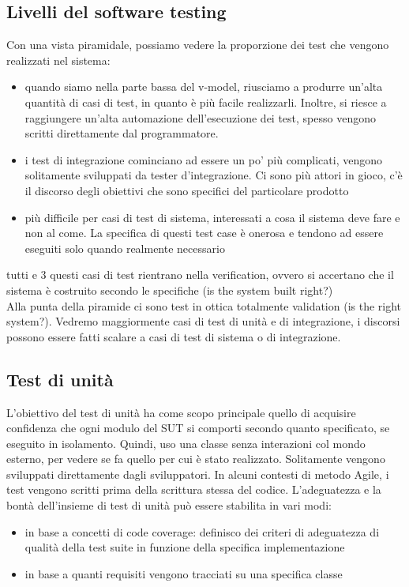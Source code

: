 \documentclass{article}
\begin{document}
\subsection{Livelli del software testing}
Con una vista piramidale, possiamo vedere la proporzione dei test che vengono realizzati nel sistema:
\begin{itemize}
\item quando siamo nella parte bassa del v-model, riusciamo a produrre un'alta quantità di casi di test, in quanto è più facile realizzarli. Inoltre, si riesce a raggiungere un'alta automazione dell'esecuzione dei test, spesso vengono scritti direttamente dal programmatore.
\item i test di integrazione cominciano ad essere un po' più complicati, vengono solitamente sviluppati da tester d'integrazione. Ci sono più attori in gioco, c'è il discorso degli obiettivi che sono specifici del particolare prodotto
\item più difficile per casi di test di sistema, interessati a cosa il sistema deve fare e non al come. La specifica di questi test case è onerosa e tendono ad essere eseguiti solo quando realmente necessario
\end{itemize}
tutti e 3 questi casi di test rientrano nella verification, ovvero si accertano che il sistema è costruito secondo le specifiche (is the system built right?)\\ Alla punta della piramide ci sono test in ottica totalmente validation (is the right system?). Vedremo maggiormente casi di test di unità e di integrazione, i discorsi possono essere fatti scalare a casi di test di sistema o di integrazione.
\subsection{Test di unità}
L'obiettivo del test di unità ha come scopo principale quello di acquisire confidenza che ogni modulo del SUT si comporti secondo quanto specificato, se eseguito in isolamento. Quindi, uso una classe senza interazioni col mondo esterno, per vedere se fa quello per cui è stato realizzato. Solitamente vengono sviluppati direttamente dagli sviluppatori. In alcuni contesti di metodo Agile, i test vengono scritti prima della scrittura stessa del codice. L'adeguatezza e la bontà dell'insieme di test di unità può essere stabilita in vari modi:
\begin{itemize}
\item in base a concetti di code coverage: definisco dei criteri di adeguatezza di qualità della test suite in funzione della specifica implementazione
\item in base a quanti requisiti vengono tracciati su una specifica classe
\end{itemize}
\end{document}
